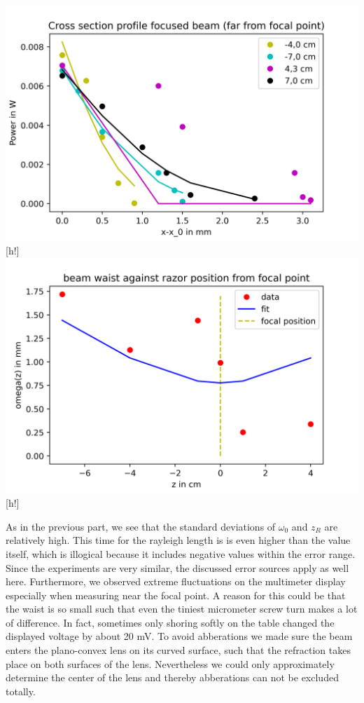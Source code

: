 \documentclass{article}
\begin{document}
\includegraphics[width=\textwidth]{Cross section profile focused beam (far from focal point).png}[h!]
\includegraphics[width=\textwidth]{beam waist against razor position from focal point.png}[h!]

As in the previous part, we see that the standard deviations of $\omega_{0}$ and $z_{R}$ are relatively high. This time for the rayleigh length is is even higher than the value itself, which is illogical because it includes negative values within the error range. Since the experiments are very similar, the discussed error sources apply as well here. Furthermore, we observed extreme fluctuations on the multimeter display especially when measuring near the focal point. A reason for this could be that the waist is so small such that even the tiniest micrometer screw turn makes a lot of difference. In fact, sometimes only shoring softly on the table changed the displayed voltage by about 20 mV. To avoid abberations we made sure the beam enters the plano-convex lens on its curved surface, such that the refraction takes place on both surfaces of the lens. Nevertheless we could only approximately determine the center of the lens and thereby abberations can not be excluded totally.
\end{document}
